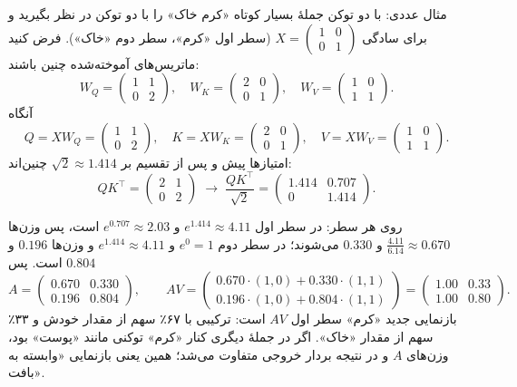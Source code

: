 \begin{addedbox}{مثال عددی:  با دو توکن}
جملهٔ بسیار کوتاه «کرم خاک» را با دو توکن در نظر بگیرید و برای سادگی $X=\begin{pmatrix}1&0\\0&1\end{pmatrix}$ (سطر اول «کرم»، سطر دوم «خاک»). فرض کنید ماتریس‌های آموخته‌شده چنین باشند:
\[
W_Q=\begin{pmatrix}1&1\\0&2\end{pmatrix},\quad
W_K=\begin{pmatrix}2&0\\0&1\end{pmatrix},\quad
W_V=\begin{pmatrix}1&0\\1&1\end{pmatrix}.
\]
آنگاه
\[
Q=XW_Q=\begin{pmatrix}1&1\\0&2\end{pmatrix},\quad
K=XW_K=\begin{pmatrix}2&0\\0&1\end{pmatrix},\quad
V=XW_V=\begin{pmatrix}1&0\\1&1\end{pmatrix}.
\]
امتیازها پیش و پس از تقسیم بر $\sqrt{2}\approx1.414$ چنین‌اند:
\[
QK^{\top}=\begin{pmatrix}2&1\\0&2\end{pmatrix}
\;\longrightarrow\;
\frac{QK^{\top}}{\sqrt2}=\begin{pmatrix}1.414&0.707\\0&1.414\end{pmatrix}.
\]

 روی هر سطر: در سطر اول $e^{1.414}\approx4.11$ و $e^{0.707}\approx2.03$ است، پس وزن‌ها $\frac{4.11}{6.14}\approx0.670$ و $0.330$ می‌شوند؛ در سطر دوم $e^{0}=1$ و $e^{1.414}\approx4.11$ و وزن‌ها $0.196$ و $0.804$ است. پس
\[
A=\begin{pmatrix}0.670&0.330\\0.196&0.804\end{pmatrix},\qquad
AV=\begin{pmatrix}0.670\cdot(1,0)+0.330\cdot(1,1)\\ 0.196\cdot(1,0)+0.804\cdot(1,1)\end{pmatrix}
=\begin{pmatrix}1.00&0.33\\1.00&0.80\end{pmatrix}.
\]
بازنمایی جدید «کرم» سطر اول $AV$ است: ترکیبی با ۶۷٪ سهم از مقدار خودش و ۳۳٪ سهم از مقدار «خاک». اگر در جملهٔ دیگری کنار «کرم» توکنی مانند «پوست» بود، وزن‌های $A$ و در نتیجه بردار خروجی متفاوت می‌شد؛ همین یعنی بازنمایی «وابسته به بافت».
\end{addedbox}


